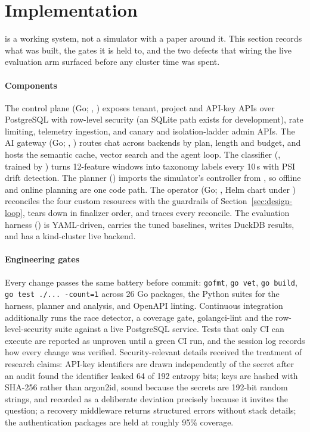 \section{Implementation}
\label{sec:impl}

\polyforge{} is a working system, not a simulator with a paper around it.
This section records what was built, the gates it is held to, and the two
defects that wiring the live evaluation arm surfaced before any cluster
time was spent.

\paragraph{Components} The control plane (Go; ,
) exposes tenant, project and API-key APIs over
PostgreSQL with row-level security (an SQLite path exists for
development), rate limiting, telemetry ingestion, and canary and
isolation-ladder admin APIs. The AI gateway (Go; ,
) routes chat across backends by plan, length and
budget, and hosts the semantic cache, vector search and the agent loop.
The classifier (, trained by
) turns 12-feature windows into taxonomy
labels every 10\,s with PSI drift detection. The \jcac{} planner
() imports the simulator's controller from
, so offline and online planning are one code
path. The operator (Go; , Helm chart under
) reconciles the four custom resources with the
guardrails of Section~\ref{sec:design-loop}, tears down in finalizer
order, and traces every reconcile. The evaluation harness ()
is YAML-driven, carries the tuned baselines, writes DuckDB results, and
has a kind-cluster live backend.

\paragraph{Engineering gates} Every change passes the same battery before
commit: \texttt{gofmt}, \texttt{go vet}, \texttt{go build}, \texttt{go
test ./... -count=1} across 26 Go packages, the Python suites for the
harness, planner and analysis, and OpenAPI linting. Continuous integration
additionally runs the race detector, a coverage gate, golangci-lint and the
row-level-security suite against a live PostgreSQL service. Tests that only
CI can execute are reported as unproven until a green CI run, and the
session log records how every change was verified. Security-relevant
details received the treatment of research claims: API-key identifiers are
drawn independently of the secret after an audit found the identifier
leaked 64 of 192 entropy bits; keys are hashed with SHA-256 rather than
argon2id, sound because the secrets are 192-bit random strings, and
recorded as a deliberate deviation precisely because it invites the
question; a recovery middleware returns structured errors without stack
details; the authentication packages are held at roughly 95\% coverage.

